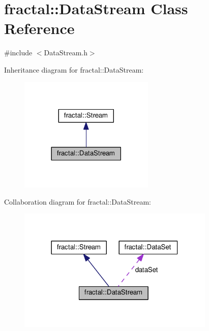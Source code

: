 \hypertarget{classfractal_1_1DataStream}{\section{fractal\+:\+:Data\+Stream Class Reference}
\label{classfractal_1_1DataStream}
}


{\ttfamily \#include $<$Data\+Stream.\+h$>$}



Inheritance diagram for fractal\+:\+:Data\+Stream\+:\nopagebreak
\begin{figure}[H]
\begin{center}
\leavevmode
\includegraphics[width=182pt]{d3/d5d/classfractal_1_1DataStream__inherit__graph}
\end{center}
\end{figure}


Collaboration diagram for fractal\+:\+:Data\+Stream\+:\nopagebreak
\begin{figure}[H]
\begin{center}
\leavevmode
\includegraphics[width=266pt]{d9/d64/classfractal_1_1DataStream__coll__graph}
\end{center}
\end{figure}
